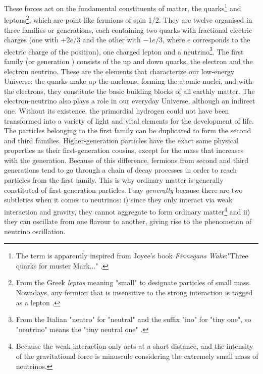 These forces act on the fundamental constituents of matter, the quarks\footnote{The term is apparently inspired from Joyce's book \textit{Finnegans Wake}:"Three quarks for muster Mark..." \cite{s.glashowInteractionsJourneyMind1990}.} and leptons\footnote{From the Greek \textit{leptos} meaning "small" to designate particles of small mass. Nowadays, any fermion that is insensitive to the strong interaction is tagged as a lepton \cite{s.glashowInteractionsJourneyMind1990}.}, which are point-like fermions of spin 1/2. They are twelve organised in three families or generations, each containing two quarks with fractional electric charges (one with $+2 e /3$ and the other with $-1 e/3$, where $e$ corresponds to the electric charge of the positron), one charged lepton and a neutrino\footnote{From the Italian "neutro" for "neutral" and the suffix "ino" for "tiny one",  so "neutrino" means the "tiny neutral one" \cite{s.glashowInteractionsJourneyMind1990}.}. The first family (or generation ) consists of the up and down quarks, the electron and the electron neutrino. These are the elements that characterize our low-energy Universe: the quarks make up the nucleons, forming the atomic nuclei, and with the electrons, they constitute the basic building blocks of all earthly matter. The electron-neutrino also plays a role in our everyday Universe, although an indirect one. Without its existence, the primordial hydrogen could not have been transformed into a variety of light and vital elements \cite{kimElectronNeutrinoDegeneracyPrimordial1997} for the development of life. The particles belonging to the first family can be duplicated to form the second and third families. Higher-generation particles have the exact same physical properties as their first-generation cousins, except for the mass that increases with the generation. Because of this difference, fermions from second and third generations tend to go through a chain of decay processes in order to reach particles from the first family. This is why ordinary matter is generally constituted of first-generation particles. I say \textit{generally} because there are two subtleties when it comes to neutrinos: i) since they only interact via weak interaction and gravity, they cannot aggregate to form ordinary matter\footnote{Because the weak interaction only acts at a short distance, and the intensity of the gravitational force is minuscule considering the extremely small mass of neutrinos.} and ii) they can oscillate from one flavour to another, giving rise to the phenomenon of neutrino oscillation. 

